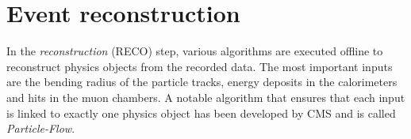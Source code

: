 \section{Event reconstruction}
In the \emph{reconstruction} (RECO) step, various algorithms are executed offline to reconstruct physics objects from the recorded data. The most important inputs are the bending radius of the particle tracks, energy deposits in the calorimeters and hits in the muon chambers. 
A notable algorithm that ensures that each input is linked to exactly one physics object has been developed by CMS and is called \emph{Particle-Flow}\cite{2009Particle}. 